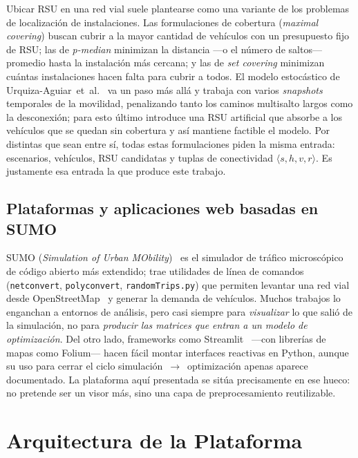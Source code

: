 \documentclass[smartcities,article,submit,oneauthor]{Definitions/mdpi}
\begin{document}
Ubicar RSU en una red vial suele plantearse como una variante de los problemas de
localización de instalaciones. Las formulaciones de cobertura (\emph{maximal
covering}) buscan cubrir a la mayor cantidad de vehículos con un presupuesto fijo de
RSU; las de \emph{p-median} minimizan la distancia ---o el número de saltos---
promedio hasta la instalación más cercana; y las de \emph{set covering} minimizan
cuántas instalaciones hacen falta para cubrir a todos. El modelo estocástico de
Urquiza-Aguiar~et~al.~\citep{ref-urquiza} va un paso más allá y trabaja con varios
\emph{snapshots} temporales de la movilidad, penalizando tanto los caminos
multisalto largos como la desconexión; para esto último introduce una RSU artificial
que absorbe a los vehículos que se quedan sin cobertura y así mantiene factible el
modelo. Por distintas que sean entre sí, todas estas formulaciones piden la misma
entrada: escenarios, vehículos, RSU candidatas y tuplas de conectividad
$\langle s,h,v,r\rangle$. Es justamente esa entrada la que produce este trabajo.

\subsection{Plataformas y aplicaciones web basadas en SUMO}

SUMO (\emph{Simulation of Urban MObility})~\citep{ref-sumo} es el simulador de
tráfico microscópico de código abierto más extendido; trae utilidades de línea de
comandos (\texttt{netconvert}, \texttt{polyconvert}, \texttt{randomTrips.py}) que
permiten levantar una red vial desde OpenStreetMap~\citep{ref-osm} y generar la
demanda de vehículos. Muchos trabajos lo enganchan a entornos de análisis, pero casi
siempre para \emph{visualizar} lo que salió de la simulación, no para \emph{producir
las matrices que entran a un modelo de optimización}. Del otro lado, frameworks como
Streamlit~\citep{ref-streamlit} ---con librerías de mapas como Folium--- hacen fácil
montar interfaces reactivas en Python, aunque su uso para cerrar el ciclo
simulación~$\rightarrow$~optimización apenas aparece documentado. La plataforma aquí
presentada se sitúa precisamente en ese hueco: no pretende ser un visor más, sino
una capa de preprocesamiento reutilizable.

\section{Arquitectura de la Plataforma}
\end{document}
